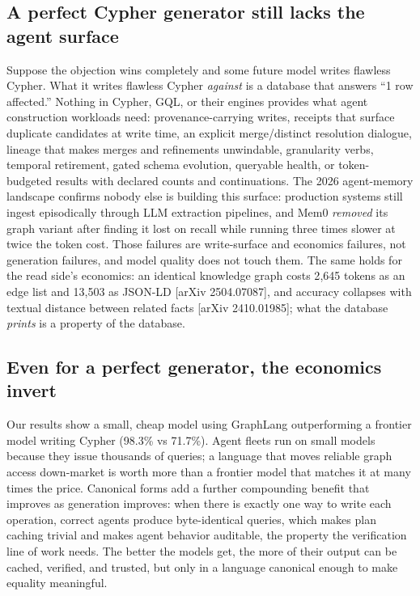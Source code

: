 \documentclass[11pt]{article}
\begin{document}
\subsection{A perfect Cypher generator still lacks the agent surface}

Suppose the objection wins completely and some future model writes flawless Cypher. What it writes flawless Cypher \emph{against} is a database that answers ``1 row affected.'' Nothing in Cypher, GQL, or their engines provides what agent construction workloads need: provenance-carrying writes, receipts that surface duplicate candidates at write time, an explicit merge/distinct resolution dialogue, lineage that makes merges and refinements unwindable, granularity verbs, temporal retirement, gated schema evolution, queryable health, or token-budgeted results with declared counts and continuations. The 2026 agent-memory landscape confirms nobody else is building this surface: production systems still ingest episodically through LLM extraction pipelines, and Mem0 \emph{removed} its graph variant after finding it lost on recall while running three times slower at twice the token cost. Those failures are write-surface and economics failures, not generation failures, and model quality does not touch them. The same holds for the read side's economics: an identical knowledge graph costs 2{,}645 tokens as an edge list and 13{,}503 as JSON-LD [arXiv 2504.07087], and accuracy collapses with textual distance between related facts [arXiv 2410.01985]; what the database \emph{prints} is a property of the database.

\subsection{Even for a perfect generator, the economics invert}

Our results show a small, cheap model using GraphLang outperforming a frontier model writing Cypher (98.3\% vs 71.7\%). Agent fleets run on small models because they issue thousands of queries; a language that moves reliable graph access down-market is worth more than a frontier model that matches it at many times the price. Canonical forms add a further compounding benefit that improves as generation improves: when there is exactly one way to write each operation, correct agents produce byte-identical queries, which makes plan caching trivial and makes agent behavior auditable, the property the verification line of work needs. The better the models get, the more of their output can be cached, verified, and trusted, but only in a language canonical enough to make equality meaningful.
\end{document}
